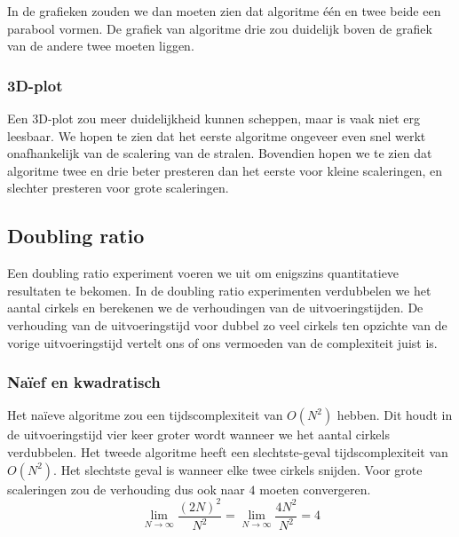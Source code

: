 In de grafieken zouden we dan moeten zien dat algoritme \'e\'en en twee beide een parabool vormen. De grafiek van algoritme drie zou duidelijk boven de grafiek van de andere twee moeten liggen.

\subsubsection{3D-plot}
Een 3D-plot zou meer duidelijkheid kunnen scheppen, maar is vaak niet erg leesbaar. We hopen te zien dat het eerste algoritme ongeveer even snel werkt onafhankelijk van de scalering van de stralen. Bovendien hopen we te zien dat algoritme twee en drie beter presteren dan het eerste voor kleine scaleringen, en slechter presteren voor grote scaleringen.


\subsection{Doubling ratio}
Een doubling ratio experiment voeren we uit om enigszins quantitatieve resultaten te bekomen. In de doubling ratio experimenten verdubbelen we het aantal cirkels en berekenen we de verhoudingen van de uitvoeringstijden. De verhouding van de uitvoeringstijd voor dubbel zo veel cirkels ten opzichte van de vorige uitvoeringstijd vertelt ons of ons vermoeden van de complexiteit juist is.

\subsubsection{Na\"ief en kwadratisch}
Het na\"ieve algoritme zou een tijdscomplexiteit van $O(N^2)$ hebben. Dit houdt in de uitvoeringstijd vier keer groter wordt wanneer we het aantal cirkels verdubbelen.
Het tweede algoritme heeft een slechtste-geval tijdscomplexiteit van $O(N^2)$. Het slechtste geval is wanneer elke twee cirkels snijden. Voor grote scaleringen zou de verhouding dus ook naar $4$ moeten convergeren.
\[
\lim_{N\rightarrow\infty}\frac{(2N)^2}{N^2}
= \lim_{N\rightarrow\infty}\frac{4N^2}{N^2}
= 4
\]

